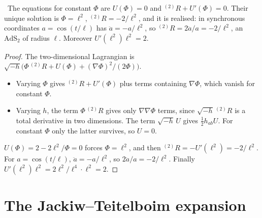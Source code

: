 \begin{proposition}\label{prop:constdilaton}\ver\
The equations for constant $\Phi$ are $U(\Phi)=0$ and ${}^{(2)}\!R+U'(\Phi)=0$. Their unique solution is $\Phi=\ell^2$, ${}^{(2)}\!R=-2/\ell^2$, and it is realised: in synchronous coordinates $a=\cos(t/\ell)$ has $\ddot a=-a/\ell^2$, so ${}^{(2)}\!R=2\ddot a/a=-2/\ell^2$, an $\mathrm{AdS}_2$ of radius $\ell$. Moreover $U'(\ell^2)\ell^2=2$.
\end{proposition}
\begin{proof}
The two-dimensional Lagrangian is $\sqrt{-h}\bigl(\Phi\,{}^{(2)}\!R+U(\Phi)+(\nabla\Phi)^2/(2\Phi)\bigr)$.
\begin{itemize}
\item Varying $\Phi$ gives ${}^{(2)}\!R+U'(\Phi)$ plus terms containing $\nabla\Phi$, which vanish for constant $\Phi$.
\item Varying $h$, the term $\Phi\,{}^{(2)}\!R$ gives only $\nabla\nabla\Phi$ terms, since $\sqrt{-h}\,{}^{(2)}\!R$ is a total derivative in two dimensions. The term $\sqrt{-h}\,U$ gives $\frac12h_{ab}U$. For constant $\Phi$ only the latter survives, so $U=0$.
\end{itemize}
$U(\Phi)=2-2\ell^2/\Phi=0$ forces $\Phi=\ell^2$, and then ${}^{(2)}\!R=-U'(\ell^2)=-2/\ell^2$. For $a=\cos(t/\ell)$, $\ddot a=-a/\ell^2$, so $2\ddot a/a=-2/\ell^2$. Finally $U'(\ell^2)\ell^2=2\ell^2/\ell^4\cdot\ell^2=2$.
\end{proof}


\section{The Jackiw--Teitelboim expansion}

